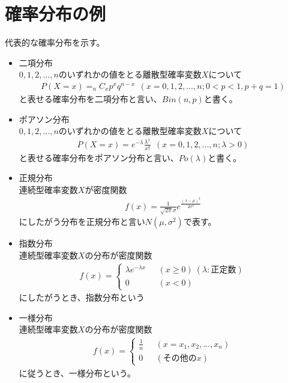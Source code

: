 \section {確率分布の例}
代表的な確率分布を示す。
\begin{itemize}
\item 二項分布\\
  $0,1,2,\ldots,n$のいずれかの値をとる離散型確率変数$X$について
  \begin {eqnarray}
    P(X=x)=_nC_xp^xq^{n-x}\ \ (x=0,1,2,\ldots,n; 0 < p <1, p+q = 1)
  \end {eqnarray}
  と表せる確率分布を二項分布と言い、$Bin(n,p)$と書く。

\item ポアソン分布\\
  $0,1,2,\ldots,n$のいずれかの値をとる離散型確率変数$X$について
  \begin {eqnarray}
    P(X=x)=e^{-\lambda}\frac{\lambda^x}{x!}\ \ (x=0,1,2,\ldots,n; \lambda>0)
  \end {eqnarray}
  と表せる確率分布をポアソン分布と言い、$Po(\lambda)$と書く。

\item 正規分布\\
  連続型確率変数$X$が密度関数
  \begin {eqnarray}
    f(x) = \frac{1}{\sqrt{2\pi}\sigma} e^{\frac{(x-\mu)^2}{2\sigma^2}}
  \end {eqnarray}
  にしたがう分布を正規分布と言い$N(\mu,\sigma^2)$で表す。

\item 指数分布\\
  連続型確率変数$X$の分布が密度関数
  \begin {eqnarray}
    f(x) = \left\{
    \begin {array}{ll}
      \lambda e^{-\lambda x}\ \ \ &(x\geq 0)\ (\lambda: 正定数)\\
      0      & (x < 0)
    \end {array}
    \right.
  \end {eqnarray}
  にしたがうとき、指数分布という

\item 一様分布\\
  連続型確率変数$X$の分布が密度関数
  \begin {eqnarray}
    f(x) = \left\{
    \begin {array}{ll}
      \frac{1}{n}\ \ \ & (x=x_1,x_2,\ldots,x_n)\\
      0      & (その他のx)
    \end {array}
    \right.
  \end {eqnarray}
  に従うとき、一様分布という。
\end {itemize}



